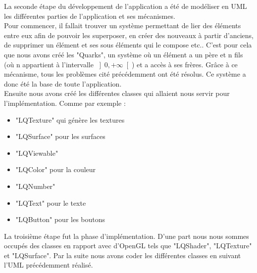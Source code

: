 \documentclass{report}
\begin{document}
La seconde étape du développement de l'application a été de modéliser en UML les différentes parties de l'application et ses mécanismes. \\
Pour commencer, il fallait trouver un système permettant de lier des éléments entre eux afin de pouvoir les superposer, en créer des nouveaux à partir d'anciens, de supprimer un élément et ses sous éléments qui le compose etc..
C'est pour cela que nous avons créé les "Quarks", un système où un élément a un  père et n fils (où n appartient à l'intervalle \(\left]0, +\infty\right[\)) et a accès à ses frères. Grâce à ce mécanisme, tous les problèmes cité précédemment ont été résolus. Ce système a donc été la base de toute l'application. \\
Ensuite nous avons créé les différentes classes qui allaient nous servir pour l'implémentation. Comme par exemple : 
\begin{itemize}[label=$-$]
    \item "LQTexture" qui génère les textures
    \item "LQSurface" pour les surfaces
    \item "LQViewable" 
    \item "LQColor" pour la couleur
    \item "LQNumber" 
    \item "LQText" pour le texte
    \item "LQButton" pour les boutons 
\end{itemize}

La troisième étape fut la phase d'implémentation. D'une part nous nous sommes occupés des classes en rapport avec d'OpenGL tels que "LQShader", "LQTexture" et "LQSurface".
Par la suite nous avons coder les différentes classes en suivant l'UML précédemment réalisé.
\end{document}
